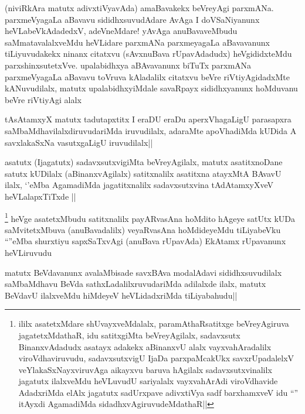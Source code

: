 \begin{artha}
(niviRkAra matutx adivxtiVyavAda) amaBavakekx beVreyAgi parxmANa. parxmeVyagaLa aBavavu sididhxsuvudAdare AvAga I doVSaNiyanunx heVLabeVkAdadedxV, adeVneMdare! yAvAga anuBavaveMbudu saMmatavalalxveMdu heVLidare parxmANa parxmeyagaLa aBavavanunx tiLiyuvudakekx ninanx citatxvu (sAvxnuBava rUpavAdadudx) heVgididxteMdu parxshinxsutetxVve. upalabidhxya aBAvavanunx biTuTx parxmANa parxmeVyagaLa aBavavu toVruva kAladalilx citatxvu beVre riVtiyAgidadxMte kANuvudilalx, matutx upalabidhxyiMdale savaRpayx sididhxyanunx hoMduvanu beVre riVtiyAgi alalx
\end{artha}


\begin{artha}
tAsAtamxyX matutx tadutapxtitx I eraDU eraDu aperxVhagaLigU parasapxra saMbaMdhavilalxdiruvudariMda iruvudilalx, adaraMte apoVhadiMda kUDida A savxlakaSxNa vasutxgaLigU iruvudilalx||
\end{artha}


\begin{artha}
asatutx (Ijagatutx) sadavxsutxvigiMta beVreyAgilalx, matutx asatitxnoDane satutx kUDilalx (aBinanxvAgilalx) satitxnalilx asatitxna atayxMtA BAvavU ilalx, `\stext'eMba AgamadiMda jagatitxnalilx sadavxsutxvina tAdAtamxyXveV heVLalapxTiTxde ||
\end{artha}

\begin{artha}
\footnote[1]{ililx asatetxMdare shUvayxveMdalalx, paramAthaRsatitxge beVreyAgiruva jagatetxMdathaR, idu satitxgiMta beVreyAgilalx, sadavxsutx BinanxvAdadudx asatayx adakekx aBinanxvU alalx vayxvahAradalilx viroVdhaviruvudu, sadavxsutxvigU IjaDa parxpaMcakUkx savxrUpadalelxV veYlakaSxNayxviruvAga aikayxvu baruva hAgilalx sadavxsutxvinalilx jagatutx ilalxveMdu heVLuvudU sariyalalx vayxvahArAdi viroVdhavide AdadxriMda elAlx jagatutx sadUrxpave adivxtiVya sadf barxhamxveV idu ``\stext'' itAyxdi AgamadiMda sidadhxvAgiruvudeMdathaR||}
heVge asatetxMbudu satitxnalilx payARvasAna hoMdito hAgeye satUtx kUDa saMvitetxMbuva (anuBavadalilx) veyaRvasAna hoMdideyeMdu tiLiyabeVku ``\stext''eMba shurxtiyu sapxSaTxvAgi (anuBava rUpavAda) EkAtamx rUpavanunx heVLiruvudu
\end{artha}

\begin{artha}
matutx BeVdavanunx avalaMbisade savxBAva modalAdavi sididhxsuvudilalx saMbaMdhavu BeVda sathxLadalilxruvudariMda adilalxde ilalx, matutx BeVdavU ilalxveMdu hiMdeyeV heVLidadxriMda tiLiyabahudu||
\end{artha}

